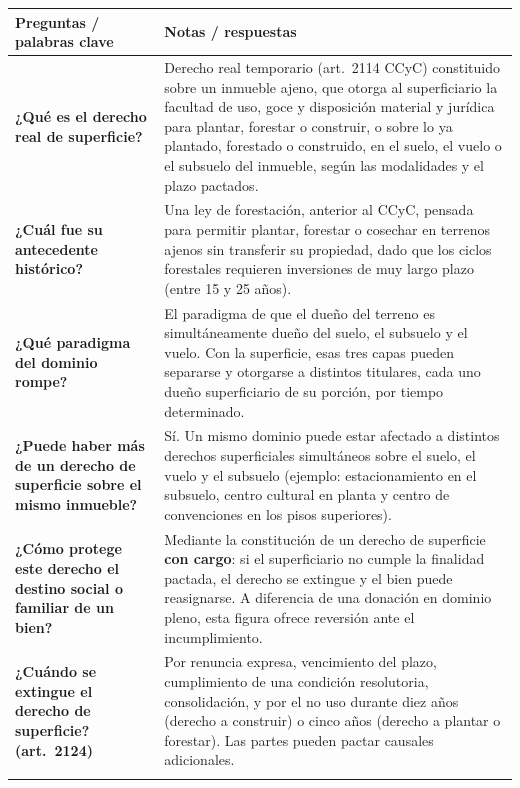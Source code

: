 \documentclass[12pt,oneside]{book}
\begin{document}
\begin{table}[H]
\centering
\begin{tabularx}{\textwidth}{
    >{\raggedright\arraybackslash}p{}
    >{\raggedright\arraybackslash}X
}
\toprule
\textbf{Preguntas / palabras clave} & \textbf{Notas / respuestas} \\
\midrule

\textbf{¿Qué es el derecho real de superficie?} &
Derecho real temporario (art.~2114 CCyC) constituido sobre un inmueble ajeno, que otorga al superficiario la facultad de uso, goce y disposición material y jurídica para plantar, forestar o construir, o sobre lo ya plantado, forestado o construido, en el suelo, el vuelo o el subsuelo del inmueble, según las modalidades y el plazo pactados. \\
\addlinespace

\textbf{¿Cuál fue su antecedente histórico?} &
Una ley de forestación, anterior al CCyC, pensada para permitir plantar, forestar o cosechar en terrenos ajenos sin transferir su propiedad, dado que los ciclos forestales requieren inversiones de muy largo plazo (entre 15 y 25 años). \\
\addlinespace

\textbf{¿Qué paradigma del dominio rompe?} &
El paradigma de que el dueño del terreno es simultáneamente dueño del suelo, el subsuelo y el vuelo. Con la superficie, esas tres capas pueden separarse y otorgarse a distintos titulares, cada uno dueño superficiario de su porción, por tiempo determinado. \\
\addlinespace

\textbf{¿Puede haber más de un derecho de superficie sobre el mismo inmueble?} &
Sí. Un mismo dominio puede estar afectado a distintos derechos superficiales simultáneos sobre el suelo, el vuelo y el subsuelo (ejemplo: estacionamiento en el subsuelo, centro cultural en planta y centro de convenciones en los pisos superiores). \\
\addlinespace

\textbf{¿Cómo protege este derecho el destino social o familiar de un bien?} &
Mediante la constitución de un derecho de superficie \textbf{con cargo}: si el superficiario no cumple la finalidad pactada, el derecho se extingue y el bien puede reasignarse. A diferencia de una donación en dominio pleno, esta figura ofrece reversión ante el incumplimiento. \\
\addlinespace

\textbf{¿Cuándo se extingue el derecho de superficie? (art.~2124)} &
Por renuncia expresa, vencimiento del plazo, cumplimiento de una condición resolutoria, consolidación, y por el no uso durante diez años (derecho a construir) o cinco años (derecho a plantar o forestar). Las partes pueden pactar causales adicionales. \\
\addlinespace


\end{tabularx}
\end{table}
\end{document}
